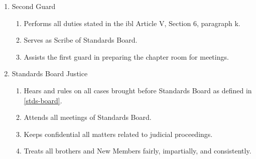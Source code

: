 \begin{enumerate}
		\item Second Guard
			\begin{enumerate}
				\item Performs all duties stated in the \gls{ibl} Article V, Section 6, paragraph k.
				\item Serves as Scribe of Standards Board.
				\item Assists the first guard in preparing the chapter room for meetings.
			\end{enumerate}
		\item Standards Board Justice
			\begin{enumerate}
				\item Hears and rules on all cases brought before Standards Board as defined in \autoref{stds-board}.
				\item Attends all meetings of Standards Board.
				\item Keeps confidential all matters related to judicial proceedings.
				\item Treats all brothers and New Members fairly, impartially, and consistently.
			\end{enumerate}
	

	\end{enumerate}

